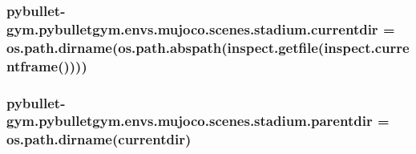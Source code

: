 \subsubsection[{\texorpdfstring{currentdir}{currentdir}}]{\setlength{\rightskip}{0pt plus 5cm}pybullet-\/gym.\+pybulletgym.\+envs.\+mujoco.\+scenes.\+stadium.\+currentdir = os.\+path.\+dirname(os.\+path.\+abspath(inspect.\+getfile(inspect.\+currentframe())))}\hypertarget{namespacepybullet-gym_1_1pybulletgym_1_1envs_1_1mujoco_1_1scenes_1_1stadium_ad81996da0d592e915f52bce205734e49}{}\label{namespacepybullet-gym_1_1pybulletgym_1_1envs_1_1mujoco_1_1scenes_1_1stadium_ad81996da0d592e915f52bce205734e49}
\subsubsection[{\texorpdfstring{parentdir}{parentdir}}]{\setlength{\rightskip}{0pt plus 5cm}pybullet-\/gym.\+pybulletgym.\+envs.\+mujoco.\+scenes.\+stadium.\+parentdir = os.\+path.\+dirname({\bf currentdir})}\hypertarget{namespacepybullet-gym_1_1pybulletgym_1_1envs_1_1mujoco_1_1scenes_1_1stadium_ac19c0021f12c470143f997177931a336}{}\label{namespacepybullet-gym_1_1pybulletgym_1_1envs_1_1mujoco_1_1scenes_1_1stadium_ac19c0021f12c470143f997177931a336}

